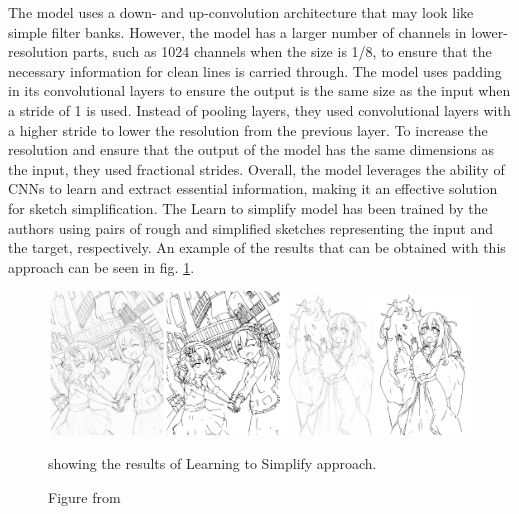 \noindent The model uses a down- and up-convolution architecture that may look like simple filter banks. However, the model has a larger number of channels in lower-resolution parts, such as 1024 channels when the size is 1/8, to ensure that the necessary information for clean lines is carried through. The model uses padding in its convolutional layers to ensure the output is the same size as the input when a stride of 1 is used. Instead of pooling layers, they used convolutional layers with a higher stride to lower the resolution from the previous layer. To increase the resolution and ensure that the output of the model has the same dimensions as the input, they used fractional strides.
Overall, the model leverages the ability of CNNs to learn and extract essential information, making it an effective solution for sketch simplification.
The Learn to simplify model has been trained by the authors using pairs of rough and simplified sketches representing the input and the target, respectively.
An example of the results that can be obtained with this approach can be seen in fig. \ref{fig:Learning to Simplify results}.
\begin{figure}[htbp]
\centering
  \includegraphics[scale=0.25]{figures/learnToSimplify-results-paper.png}
  \caption{Figure from \cite{SketchSimplify}} showing the results of Learning to Simplify approach.
  \label{fig:Learning to Simplify results}
\end{figure}


